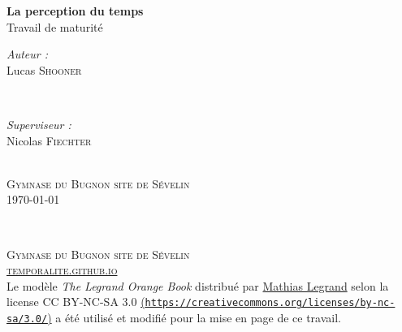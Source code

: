 \documentclass[12pt,fleqn,oneside,openany]{book} %
\begin{document}

\begingroup
\thispagestyle{empty}
\centering
\vspace*{6,8cm}
\par\normalfont\fontsize{35}{35}\sffamily\selectfont

\textbf{La perception du temps}\\
{\LARGE Travail de maturité}\par %
\vspace*{0,8cm}
\begin{minipage}{0.445\textwidth}
	\begin{flushleft} \large
		\emph{Auteur :}\\
		{\Large Lucas \textsc{Shooner}} %
	\end{flushleft}
\end{minipage}
~
\begin{minipage}{0.445\textwidth}
	\begin{flushright} \large
		\emph{Superviseur :} \\
		{\Large Nicolas \textsc{Fiechter}} %
	\end{flushright}
\end{minipage} \\ 
{{\large \textsc{Gymnase du Bugnon site de Sévelin}}} \\
{\large \today}\\ \par
\endgroup


\newpage
~\vfill
\thispagestyle{empty}

\noindent \textsc{Gymnase du Bugnon site de Sévelin}\\

\noindent \textsc{\href{https://temporalite.github.io}{temporalite.github.io}}\\ 

\noindent Le modèle \emph{The Legrand Orange Book} distribué par \href{legrand.mathias@gmail.com}{Mathias Legrand} selon la license CC BY-NC-SA 3.0 \href{https://creativecommons.org/licenses/by-nc-sa/3.0/}{ (\texttt{https://creativecommons.org/licenses/by-nc-sa/3.0/})} a été utilisé et modifié pour la mise en page de ce travail. \\ 
\end{document}
